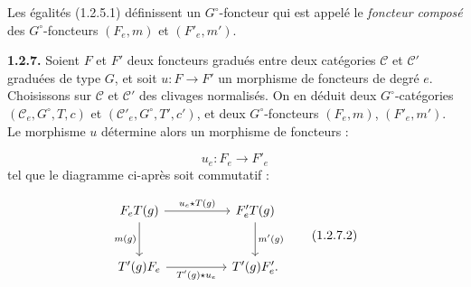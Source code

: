 Les égalités (1.2.5.1) définissent un $G^\circ$-foncteur qui est appelé
le \emph{foncteur composé} des $G^\circ$-foncteurs $(F_e,m)$ et
$(F'_e,m')$.

\noindent\textbf{1.2.7.}\quad
Soient $F$ et $F'$ deux foncteurs gradués entre deux catégories
$\mathcal C$ et $\mathcal C'$ graduées de type $G$, et soit
$u\colon F\to F'$ un morphisme de foncteurs de degré $e$. Choisissons
sur $\mathcal C$ et $\mathcal C'$ des clivages normalisés. On en déduit
deux $G^\circ$-catégories $(\mathcal C_e,G^\circ,T,c)$ et
$(\mathcal C'_e,G^\circ,T',c')$, et deux $G^\circ$-foncteurs
$(F_e,m)$, $(F'_e,m')$. Le morphisme $u$ détermine alors un morphisme de
foncteurs :

\begin{equation}
  u_e\colon F_e\longrightarrow F'_e
  \tag{1.2.7.1}
\end{equation}
tel que le diagramme ci-après soit commutatif :

\begin{equation}
\begin{tikzcd}[column sep=huge,row sep=large]
F_eT(g)
  \arrow[r,"u_e\star T(g)"]
  \arrow[d,"m(g)",swap]
&
F_e^{\prime}T(g)
  \arrow[d,"m^{\prime}(g)"]
\\
T^{\prime}(g)F_e
  \arrow[r,"T^{\prime}(g)\star u_e",swap]
&
T^{\prime}(g)F_e^{\prime}\mathpunct{.}
\end{tikzcd}
\tag{1.2.7.2}
\end{equation}
